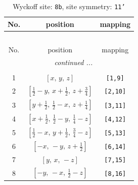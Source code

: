 \documentclass[fleqn,8pt]{jsarticle}
\begin{document}
\begin{longtable}{ccc}
\caption{Wyckoff site: {\tt 8b}, site symmetry: {\tt 11'}}
 \\
 \hline \hline
No. & position & mapping \\ \hline \endfirsthead

\multicolumn{2}{l}{\tablename\ \thetable{}} \\
 \hline \hline
No. & position & mapping \\ \hline \endhead

 \hline \hline
\multicolumn{2}{r}{\footnotesize\it continued ...} \\ \endfoot

 \hline \hline
\multicolumn{2}{r}{} \\ \endlastfoot

1 & $\left[ x,\, y,\, z \right]$ & {\tt [1,9]} \\ \hline
2 & $\left[ \frac{1}{2} - y,\, x + \frac{1}{2},\, z + \frac{3}{4} \right]$ & {\tt [2,10]} \\ \hline
3 & $\left[ y + \frac{1}{2},\, \frac{1}{2} - x,\, z + \frac{1}{4} \right]$ & {\tt [3,11]} \\ \hline
4 & $\left[ x + \frac{1}{2},\, \frac{1}{2} - y,\, \frac{1}{4} - z \right]$ & {\tt [4,12]} \\ \hline
5 & $\left[ \frac{1}{2} - x,\, y + \frac{1}{2},\, \frac{3}{4} - z \right]$ & {\tt [5,13]} \\ \hline
6 & $\left[ - x,\, - y,\, z + \frac{1}{2} \right]$ & {\tt [6,14]} \\ \hline
7 & $\left[ y,\, x,\, - z \right]$ & {\tt [7,15]} \\ \hline
8 & $\left[ - y,\, - x,\, \frac{1}{2} - z \right]$ & {\tt [8,16]} \\
\end{longtable}
\end{document}
